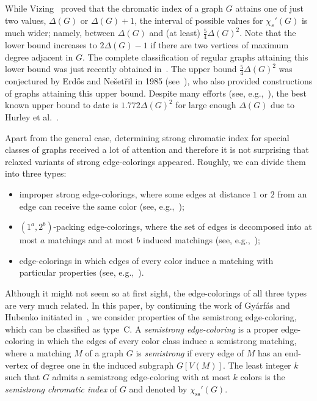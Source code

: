 \documentclass[12pt,a4paper]{article}
\newcommand{\chis}[1]{\ensuremath{\chi_{s}'(#1)}}
\newcommand{\chiss}[1]{\ensuremath{\chi_{\mathrm{ss}}'(#1)}}
\begin{document}
While Vizing~\cite{Viz64} proved that the chromatic index of a graph $G$ attains one of just two values, $\Delta(G)$ or $\Delta(G)+1$, 
the interval of possible values for $\chis{G}$ is much wider;
namely, between $\Delta(G)$ and (at least) $\frac{5}{4}\Delta(G)^2$.
Note that the lower bound increases to $2\Delta(G)-1$ if there are two vertices of maximum degree adjacent in $G$.
The complete classification of regular graphs attaining this lower bound was just recently obtained in~\cite{LuzMacSkoSot22}.
The upper bound $\frac{5}{4}\Delta(G)^2$ was conjectured by Erd\H{o}s and Ne\v{s}et\v{r}il in 1985 (see~\cite{Erd88}),
who also provided constructions of graphs attaining this upper bound.
Despite many efforts (see, e.g.,~\cite{BonPerPost22,BruJoo18,MolRee97}), 
the best known upper bound to date is $1.772\Delta(G)^2$ for large enough $\Delta(G)$ due to Hurley et al.~\cite{HurJoaKan21}.

Apart from the general case, determining strong chromatic index for special classes of graphs received
a lot of attention and therefore it is not surprising that relaxed variants of strong edge-colorings appeared.
Roughly, we can divide them into three types: 
\begin{itemize}
	\item[(A)] improper strong edge-colorings, where some edges at distance $1$ or $2$ from an edge can receive the same color (see, e.g.,~\cite{HeLin17});
	\item[(B)] $(1^a,2^b)$-packing edge-colorings, where the set of edges is decomposed into at most $a$ matchings and at most $b$ induced matchings (see, e.g.,~\cite{HocLajLuz22});
	\item[(C)] edge-colorings in which edges of every color induce a matching with particular properties (see, e.g.,~\cite{BasRau18,GodHedHedLas05,GyaHub05}).
\end{itemize}

Although it might not seem so at first sight, the edge-colorings of all three types are very much related.
In this paper, by continuing the work of Gy\'{a}rf\'{a}s and Hubenko initiated in~\cite{GyaHub05},
we consider properties of the semistrong edge-coloring, which can be classified as type~C.
A {\em semistrong edge-coloring} is a proper edge-coloring in which the edges of every color class induce a semistrong matching,
where a matching $M$ of a graph $G$ is {\em semistrong} if every edge of $M$ has an end-vertex of degree one in the induced subgraph $G[V(M)]$.
The least integer $k$ such that $G$ admits a semistrong edge-coloring with at most $k$ colors is 
the {\em semistrong chromatic index} of $G$ and denoted by $\chiss{G}$.
\end{document}

